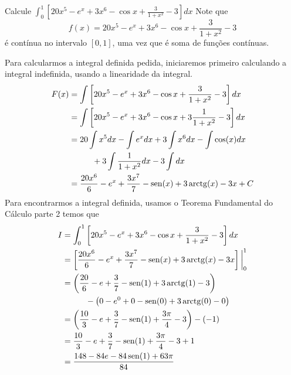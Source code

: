 \begin{example}
  Calcule
  \(
    \int_0^1 \left[ 20x^5-e^x+ 3x^6- \cos x+ \frac{3}{1+x^2}-3 \right] dx
  \)
  \solution
  Note que
  \[
    f(x)=20x^5-e^x+ 3x^6- \cos x+ \frac{3}{1+x^2}-3
  \]
  é contínua no
  intervalo $[0, 1]$, uma vez que é soma de funções contínuas.

  Para calcularmos a integral definida pedida, iniciaremos primeiro calculando
  a integral indefinida, usando a linearidade da integral.
  \begin{align*}
    F(x)
    & = \int \left[ 20x^5-e^x+ 3x^6 - \cos x+  \frac{3}{1+x^2}-3 \right] dx \\
    & = \int \left[ 20x^5-e^x+ 3x^6 - \cos x+ 3\frac{1}{1+x^2}-3 \right] dx \\
    & = 20 \int x^5 dx
      -    \int e^x dx
      + 3  \int x^6 dx
      -    \int \cos(x) dx \\
    & \hspace{10mm}
      + 3  \int \frac{1}{1+x^2} dx
      - 3  \int dx \\
    & = \frac{20x^6}{6}
      - e^x
      + \frac{3x^7}{7}
      - \sin(x)
      + 3\arctan(x)
      - 3x + C
  \end{align*}
  Para encontrarmos a integral definida, usamos o Teorema Fundamental do
  Cálculo parte 2 temos que
  \begin{align*}
    I
    & = \int_0^1 \left[ 20x^5-e^x+ 3x^6- \cos x+ \frac{3}{1+x^2}-3 \right] dx \\
    & = \left[ \frac{20x^6}{6}
      - e^x
      + \frac{3x^7}{7}
      - \sin(x)
      + 3\arctan(x)
      - 3x \right] \evalat{0}{1} \\
    & = \left( \frac{20}{6}
      - e
      + \frac{3}{7}
      - \sin(1)
      + 3 \arctan(1)
      - 3 \right) \\
    & \hspace{10mm}
      - \left( 0 - e^0 + 0 - \sin(0) + 3\arctan(0) - 0 \right) \\
    & = \left(\frac{10}{3}-e+\frac{3}{7}-\sin(1) + \frac{3\pi}{4} - 3 \right) - (-1) \\
    & = \frac{10}{3} - e + \frac{3}{7} - \sin(1) + \frac{3\pi}{4} - 3 + 1 \\
    & = \frac{148 - 84e - 84 \sin(1) + 63 \pi}{84}
  \end{align*}
\end{example}


